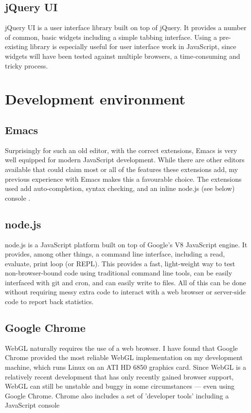 \documentclass[12pt,twoside,notitlepage]{report}
\begin{document}
\subsection*{jQuery UI}
jQuery UI is a user interface library built on top of jQuery. It provides a number of common, basic widgets including a simple tabbing interface. Using a pre-existing library is especially useful for user interface work in JavaScript, since widgets will have been tested against multiple browsers, a time-consuming and tricky process.

\section{Development environment}
\subsection*{Emacs}
Surprisingly for such an old editor, with the correct extensions, Emacs is very well equipped for modern JavaScript development. While there are other editors available that could claim most or all of the features these extensions add, my previous experience with Emacs makes this a favourable choice. The extensions used add auto-completion, syntax checking, and an inline node.js (see below) console \citep{emacs-js}.

\subsection*{node.js}
node.js is a JavaScript platform built on top of Google's V8 JavaScript engine\citep{v8}. It provides, among other things, a command line interface, including a read, evaluate, print loop (or REPL). This provides a fast, light-weight way to test non-browser-bound code using traditional command line tools, can be easily interfaced with git and cron, and can easily write to files. All of this can be done without requiring messy extra code to interact with a web browser or server-side code to report back statistics.

\subsection*{Google Chrome}
WebGL naturally requires the use of a web browser. I have found that Google Chrome provided the most reliable WebGL implementation on my development machine, which runs Linux on an ATI HD 6850 graphics card. Since {WebGL} is a relatively recent development that has only recently gained browser support, WebGL can still be unstable and buggy in some circumstances --- even using Google Chrome. Chrome also includes a set of 'developer tools' including a JavaScript console 
\end{document}
